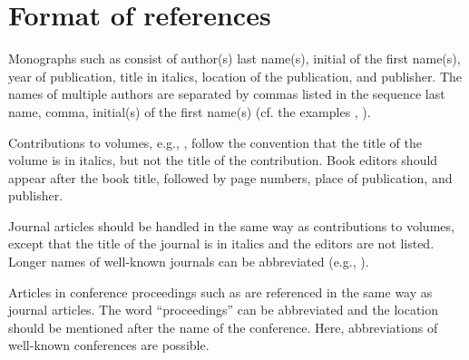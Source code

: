\documentclass{tls}
\begin{document}
\section{Format of references}

Monographs such as  consist of author(s) last name(s), initial of the first name(s), year of publication, title in italics, location of the publication, and publisher. The names of multiple authors are separated by commas listed in the sequence last name, comma, initial(s) of the first name(s) (cf. the examples , ).

Contributions to volumes, e.g., , follow the convention that the title of the volume is in italics, but not the title of the contribution. Book editors should appear after the book title, followed by page numbers, place of publication, and publisher.

Journal articles should be handled in the same way as contributions to volumes, except that the title of the journal is in italics and the editors are not listed. Longer names of well-known journals can be abbreviated (e.g., ).

Articles in conference proceedings such as  are referenced in the same way as journal articles. The word ``proceedings'' can be abbreviated and the location should be mentioned after the name of the conference. Here, abbreviations of well-known conferences are possible.


\end{document}
